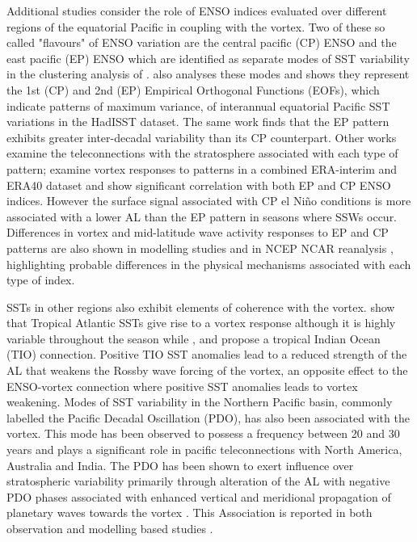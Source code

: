 Additional studies consider the role of ENSO indices evaluated over different regions of the equatorial Pacific in coupling with the vortex. Two of these so called  "flavours" of ENSO variation are the central pacific (CP) ENSO and the east pacific (EP) ENSO which are identified as separate modes of SST variability in the clustering analysis of \cite{johnsonHow2013}. \cite{kaoContrasting2009} also analyses these modes and shows they represent the 1st (CP) and 2nd (EP) Empirical Orthogonal Functions (EOFs), which indicate patterns of maximum variance, of interannual equatorial Pacific SST variations in the HadISST dataset. The same work finds that the EP pattern exhibits greater inter-decadal variability than its CP counterpart. Other works examine the teleconnections with the stratosphere associated with each type of pattern; \cite{izaRole2015} examine vortex responses to patterns in a combined ERA-interim and ERA40 dataset and show significant correlation with both EP and CP ENSO indices. However the surface signal associated with CP el Ni\~{n}o conditions is more associated with a lower AL than the EP pattern in seasons where SSWs occur. Differences in vortex and mid-latitude wave activity responses to EP and CP patterns are also shown in modelling studies \citep{hegyiDynamical2011} and in NCEP NCAR reanalysis \citep{sungAltered2014}, highlighting probable differences in the physical mechanisms associated with each type of index. 

SSTs in other regions also exhibit elements of coherence with the vortex. \cite{raoVarying2018} show that Tropical Atlantic SSTs give rise to a vortex response although it is highly variable throughout the season while \cite{fletcherRole2011}, \cite{fletcherLinear2013} and \cite{raoDecomposition2016} propose a tropical Indian Ocean (TIO) connection. Positive TIO SST anomalies lead to a reduced strength of the AL that weakens the Rossby wave forcing of the vortex, an opposite effect to the ENSO-vortex connection where positive SST anomalies leads to vortex weakening. Modes of SST variability in the Northern Pacific basin, commonly labelled the Pacific Decadal Oscillation (PDO), has also been associated with the vortex. This mode has been observed to possess a frequency between 20 and 30 years \citep{henleyTripole2015} and plays a significant role in pacific teleconnections with North America, Australia and India. The PDO has been shown to exert influence over stratospheric variability primarily through alteration of the AL with negative PDO phases associated with enhanced vertical and meridional propagation of planetary waves towards the vortex \citep{mantuaPacific1997, rodionovSpatial2005,raoModulation2019}. This Association is reported in both observation and modelling based studies \citep{garcia-herreraPropagation2006, krenWintertime2016, huDecadal2018}.

